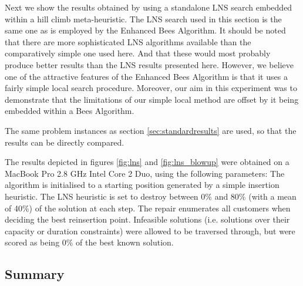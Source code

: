 Next we show the results obtained by using a standalone LNS search embedded within a hill climb meta-heuristic. The LNS search used in this section is the same one as is employed by the Enhanced Bees Algorithm. It should be noted that there are more sophisticated LNS algorithms available than the comparatively simple one used here. And that these would most probably produce better results than the LNS results presented here. However, we believe one of the attractive features of the Enhanced Bees Algorithm is that it uses a fairly simple local search procedure. Moreover, our aim in this experiment was to demonstrate that the limitations of our simple local method are offset by it being embedded within a Bees Algorithm.

The same problem instances as section \ref{sec:standardresults} are used, so that the results can be directly compared.



The results depicted in figures \ref{fig:lns} and \ref{fig:lns_blowup} were obtained on a MacBook Pro 2.8 GHz Intel Core 2 Duo, using the following parameters: The algorithm is initialised to a starting position generated by a simple insertion heuristic. The LNS heuristic is set to destroy between 0\% and 80\% (with a mean of 40\%) of the solution at each step. The repair enumerates all customers when deciding the best reinsertion point. Infeasible solutions (i.e. solutions over their capacity or duration constraints) were allowed to be traversed through, but were scored as being 0\% of the best known solution.

\subsection{Summary}

